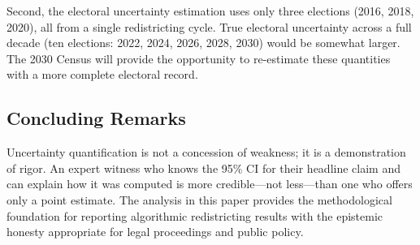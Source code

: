 Second, the electoral uncertainty estimation uses only three elections
(2016, 2018, 2020), all from a single redistricting cycle. True
electoral uncertainty across a full decade (ten elections: 2022, 2024,
2026, 2028, 2030) would be somewhat larger. The 2030 Census will
provide the opportunity to re-estimate these quantities with a more
complete electoral record.

\subsection{Concluding Remarks}

Uncertainty quantification is not a concession of weakness; it is a
demonstration of rigor. An expert witness who knows the 95\% CI for
their headline claim and can explain how it was computed is more
credible---not less---than one who offers only a point estimate.
The analysis in this paper provides the methodological foundation
for reporting algorithmic redistricting results with the epistemic
honesty appropriate for legal proceedings and public policy.
